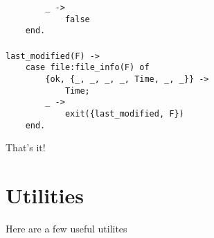 \begin{flushleft}
\verb&        _ ->&\\
\noindent{}%
\verb&            false&\\
\noindent{}%
\verb&    end.&\\
\noindent{}%
\verb&&\\
\noindent{}%
\verb&last_modified(F) ->&\\
\noindent{}%
\verb&    case file:file_info(F) of&\\
\noindent{}%
\verb&        {ok, {_, _, _, _, Time, _, _}} ->&\\
\noindent{}%
\verb&            Time;&\\
\noindent{}%
\verb&        _ ->&\\
\noindent{}%
\verb&            exit({last_modified, F})&\\
\noindent{}%
\verb&    end.&\\
\end{flushleft}

That's it!

\section*{Utilities}

Here are a few useful utilites

